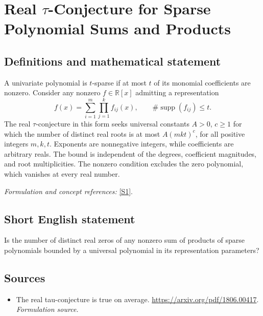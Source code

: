 \documentclass[11pt]{article}
\begin{document}
\section*{\texorpdfstring{Real $\tau$-Conjecture for Sparse Polynomial Sums and Products}{Real \$\textbackslash{}tau\$-Conjecture for Sparse Polynomial Sums and Products}}\label{30002235}
\subsection{Definitions and mathematical statement}
A univariate polynomial is $t$-sparse if at most $t$ of its monomial coefficients are nonzero. Consider any nonzero $f\in{\mathbb{R}}[x]$ admitting a representation
\[
 f(x)=\sum_{i=1}^{m}\prod_{j=1}^{k}f_{ij}(x),
 \qquad \#\operatorname{supp}(f_{ij})\le t.
\]
The real $\tau$-conjecture in this form seeks universal constants $A>0$, $c\ge1$ for which the number of distinct real roots is at most $A(mkt)^c$, for all positive integers $m,k,t$. Exponents are nonnegative integers, while coefficients are arbitrary reals. The bound is independent of the degrees, coefficient magnitudes, and root multiplicities. The nonzero condition excludes the zero polynomial, which vanishes at every real number.
\par\smallskip\textit{Formulation and concept references:} \href{https://arxiv.org/pdf/1806.00417}{[S1]}.

\subsection{Short English statement}
Is the number of distinct real zeros of any nonzero sum of products of sparse polynomials bounded by a universal polynomial in its representation parameters?
\subsection{Sources}
\begin{itemize}
\item[S1]The real tau-conjecture is true on average.
\url{https://arxiv.org/pdf/1806.00417}.
\textit{Formulation source.}
\end{itemize}
\end{document}
